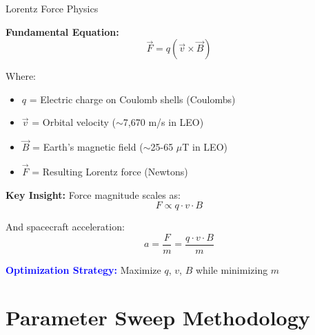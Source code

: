 \documentclass[11pt]{beamer}
\begin{document}
\begin{frame}{Lorentz Force Physics}

\textbf{Fundamental Equation:}
\begin{equation}
\vec{F} = q(\vec{v} \times \vec{B})
\end{equation}

Where:
\begin{itemize}
\item $q$ = Electric charge on Coulomb shells (Coulombs)
\item $\vec{v}$ = Orbital velocity ($\sim$7,670 m/s in LEO)
\item $\vec{B}$ = Earth's magnetic field ($\sim$25-65 $\mu$T in LEO)
\item $\vec{F}$ = Resulting Lorentz force (Newtons)
\end{itemize}

\vspace{0.3cm}

\textbf{Key Insight:}
Force magnitude scales as:
\begin{equation}
F \propto q \cdot v \cdot B
\end{equation}

And spacecraft acceleration:
\begin{equation}
a = \frac{F}{m} = \frac{q \cdot v \cdot B}{m}
\end{equation}

\textcolor{blue}{\textbf{Optimization Strategy:}} Maximize $q$, $v$, $B$ while minimizing $m$

\end{frame}

\section{Parameter Sweep Methodology}
\end{document}
